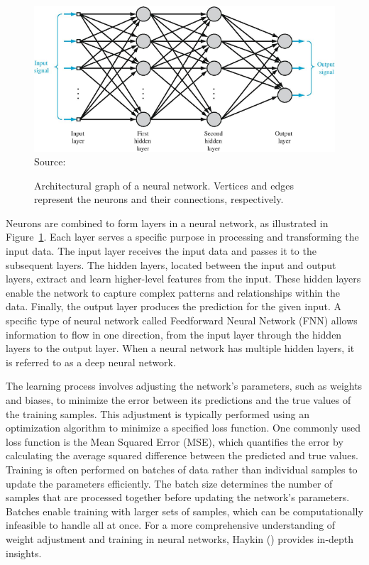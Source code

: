 \begin{figure}
    \caption[Architectural graph of a neural network.]{Architectural graph of a neural network. Vertices and edges represent the neurons and their connections, respectively.}
    \label{fig:neuralnetwork}
    \addvspace{\baselineskip}
    \centering
    \includegraphics[width=0.9\linewidth]{figures/network.png} \\
    \addvspace{\baselineskip}
    Source:~\cite{Haykin/2009}
\end{figure}

Neurons are combined to form layers in a neural network, as illustrated in Figure~\ref{fig:neuralnetwork}. Each layer serves a specific purpose in processing and transforming the input data. The input layer receives the input data and passes it to the subsequent layers. The hidden layers, located between the input and output layers, extract and learn higher-level features from the input. These hidden layers enable the network to capture complex patterns and relationships within the data. Finally, the output layer produces the prediction for the given input. A specific type of neural network called Feedforward Neural Network (FNN) allows information to flow in one direction, from the input layer through the hidden layers to the output layer. When a neural network has multiple hidden layers, it is referred to as a deep neural network.

The learning process involves adjusting the network's parameters, such as weights and biases, to minimize the error between its predictions and the true values of the training samples. This adjustment is typically performed using an optimization algorithm to minimize a specified loss function. One commonly used loss function is the Mean Squared Error (MSE), which quantifies the error by calculating the average squared difference between the predicted and true values. Training is often performed on batches of data rather than individual samples to update the parameters efficiently. The batch size determines the number of samples that are processed together before updating the network's parameters. Batches enable training with larger sets of samples, which can be computationally infeasible to handle all at once. For a more comprehensive understanding of weight adjustment and training in neural networks, Haykin (\citeyear{Haykin/2009}) provides in-depth insights.

